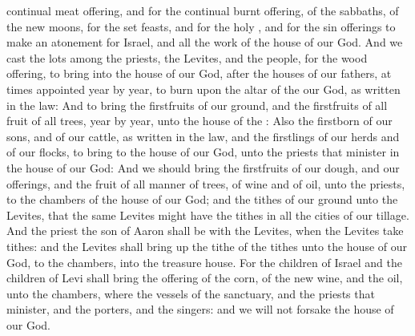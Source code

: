 {continual meat
offering, and for the
continual burnt
offering, of the
sabbaths, of the new
moons, for the set
feasts, and for the
holy
{}, and for the sin
offerings to make an
atonement for
Israel, and
{} all the
work of the
house of our
God.
And we
cast the
lots among the
priests, the
Levites, and the
people, for the
wood
offering, to
bring
{} into the
house of our
God, after the
houses of our
fathers, at
times
appointed
year by
year, to
burn upon the
altar of the
{} our
God, as
{}
written in the
law:
And to
bring the
firstfruits of our
ground, and the
firstfruits of all
fruit of all
trees,
year by
year, unto the
house of the
{}:
Also the
firstborn of our
sons, and of our
cattle, as
{}
written in the
law, and the
firstlings of our
herds and of our
flocks, to
bring to the
house of our
God, unto the
priests that
minister in the
house of our
God:
And
{} we should
bring the
firstfruits of our
dough, and our
offerings, and the
fruit of all manner of
trees, of
wine and of
oil, unto the
priests, to the
chambers of the
house of our
God; and the
tithes of our
ground unto the
Levites, that the same
Levites might have the
tithes in all the
cities of our
tillage.
And the
priest the
son of
Aaron shall be with the
Levites, when the
Levites take
tithes: and the
Levites shall bring
up the
tithe of the
tithes unto the
house of our
God, to the
chambers, into the
treasure
house.
For the
children of
Israel and the
children of
Levi shall
bring the
offering of the
corn, of the new
wine, and the
oil, unto the
chambers, where
{} the
vessels of the
sanctuary, and the
priests that
minister, and the
porters, and the
singers: and we will not
forsake the
house of our
God.

}

